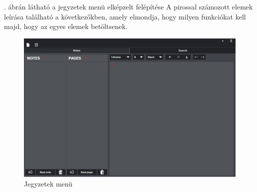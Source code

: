 
. ábrán látható a jegyzetek menü elképzelt felépítése A pirossal számozott elemek leírása található a következőkben, amely elmondja, hogy milyen funkciókat kell majd, hogy az egyes elemek betöltsenek.

\begin{figure}[h]
	\centering
	\includegraphics[scale=0.5]{images/menu_2.png}
	\caption{Jegyzetek menü}
	\label{fig:menu_notes}
\end{figure}

